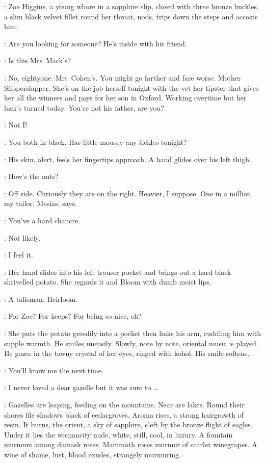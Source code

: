 :
Zoe Higgins,
a young whore in a sapphire slip,
closed with three bronze buckles,
a slim black velvet fillet round her throat,
nods,
trips down the steps and accosts him.

\Zoe:
Are you looking for someone?
He's inside with his friend.

\Bloom:
Is this Mrs~Mack's?

\Zoe:
No,
eightyone.
Mrs~Cohen's.
You might go farther and fare worse.
Mother Slipperslapper.
She's on the job herself tonight with the vet
her tipster that gives her all the winners and pays for her son in Oxford.
Working overtime but her luck's turned today.
You're not his father,
are you?

\Bloom:
Not I!

\Zoe:
You both in black.
Has little mousey any tickles tonight?

:
His skin,
alert,
feels her fingertips approach.
A hand glides over his left thigh.

\Zoe:
How's the nuts?

\Bloom:
Off side.
Curiously they are on the right.
Heavier,
I suppose.
One in a million my tailor,
Mesias,
says.

\Zoe:
You've a hard chancre.

\Bloom:
Not likely.

\Zoe:
I feel it.

:
Her hand slides into his left trouser pocket
and brings out a hard black shrivelled potato.
She regards it and Bloom with dumb moist lips.

\Bloom:
A talisman.
Heirloom.

\Zoe:
For Zoe?
For keeps?
For being so nice,
eh?

:
She puts the potato greedily into a pocket then links his arm,
cuddling him with supple warmth.
He smiles uneasily.
Slowly,
note by note,
oriental music is played.
He gazes in the tawny crystal of her eyes,
ringed with kohol.
His smile softens.

\Zoe:
You'll know me the next time.

\Bloom:
I never loved a dear gazelle but it was sure to \ldots

:
Gazelles are leaping,
feeding on the mountains.
Near are lakes.
Round their shores file shadows black of cedargroves.
Aroma rises,
a strong hairgrowth of resin.
It burns,
the orient,
a sky of sapphire,
cleft by the bronze flight of eagles.
Under it lies the womancity nude,
white,
still,
cool,
in luxury.
A fountain murmurs among damask roses.
Mammoth roses murmur of scarlet winegrapes.
A wine of shame,
lust,
blood exudes,
strangely murmuring.%

